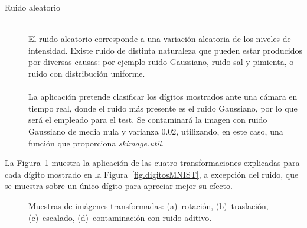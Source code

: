 \begin{description}
	\vspace{5pt}
	\item[Ruido aleatorio] \hfill 
	\vspace{5pt}
	\\
	El ruido aleatorio corresponde a una variación aleatoria de los niveles de intensidad. Existe ruido de distinta naturaleza que pueden estar producidos por diversas causas: por ejemplo ruido Gaussiano, ruido sal y pimienta, o ruido con distribución uniforme.\\
	\vspace{-10pt}
	\\
	La aplicación pretende clasificar los dígitos mostrados ante una cámara en tiempo real, donde el ruido más presente es el ruido Gaussiano, por lo que será el empleado para el test. Se contaminará la imagen con ruido Gaussiano de media nula y varianza 0.02, utilizando, en este caso, una función que proporciona \textit{skimage.util}. 
\end{description}

La Figura~\ref{fig.transformaciones} muestra la aplicación de las cuatro transformaciones explicadas para cada dígito mostrado en la Figura~\ref{fig.digitosMNIST}, a excepción del ruido, que se muestra sobre un único dígito para apreciar mejor su efecto.

\begin{figure}[H]
	\centering
	 \hspace{10pt}
	 \hspace{10pt}
	 \hspace{10pt}
	\caption{Muestras de imágenes transformadas: (a)~rotación, (b)~traslación, (c)~escalado, (d)~contaminación con ruido aditivo.}
	\label{fig.transformaciones}
\end{figure}

